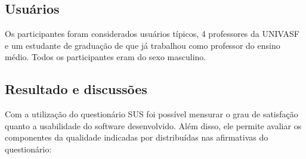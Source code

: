 \subsection{Usuários}

Os participantes foram considerados usuários típicos, 4 professores da UNIVASF e
um estudante de graduação de que já trabalhou como professor do ensino médio. Todos os
participantes eram do sexo masculino.

\subsection{Resultado e discussões}

Com a utilização do questionário SUS foi possível mensurar o grau de satisfação quanto
a usabilidade do software desenvolvido. Além disso, ele permite avaliar os componentes da
qualidade indicadas por  distribuídas nas afirmativas do questionário:

